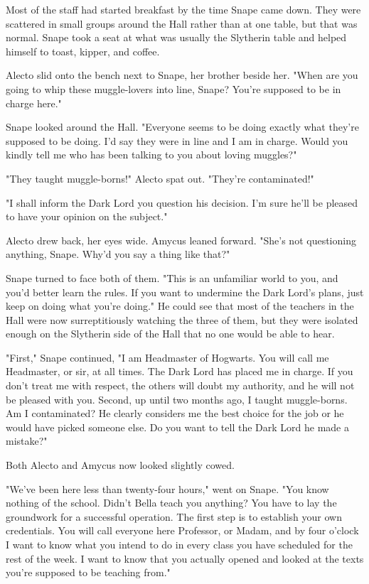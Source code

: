 \documentclass[a4paper,11pt]{article}
\begin{document}
Most of the staff had started breakfast by the time Snape came down. They were scattered in small groups around the Hall rather than at one table, but that was normal. Snape took a seat at what was usually the Slytherin table and helped himself to toast, kipper, and coffee.

Alecto slid onto the bench next to Snape, her brother beside her. "When are you going to whip these muggle-lovers into line, Snape? You're supposed to be in charge here."

Snape looked around the Hall. "Everyone seems to be doing exactly what they're supposed to be doing. I'd say they were in line and I am in charge. Would you kindly tell me who has been talking to you about loving muggles?"

"They taught muggle-borns!" Alecto spat out. "They're contaminated!"

"I shall inform the Dark Lord you question his decision. I'm sure he'll be pleased to have your opinion on the subject."

Alecto drew back, her eyes wide. Amycus leaned forward. "She's not questioning anything, Snape. Why'd you say a thing like that?"

Snape turned to face both of them. "This is an unfamiliar world to you, and you'd better learn the rules. If you want to undermine the Dark Lord's plans, just keep on doing what you're doing." He could see that most of the teachers in the Hall were now surreptitiously watching the three of them, but they were isolated enough on the Slytherin side of the Hall that no one would be able to hear.

"First," Snape continued, "I am Headmaster of Hogwarts. You will call me Headmaster, or sir, at all times. The Dark Lord has placed me in charge. If you don't treat me with respect, the others will doubt my authority, and he will not be pleased with you. Second, up until two months ago, I taught muggle-borns. Am I contaminated? He clearly considers me the best choice for the job or he would have picked someone else. Do you want to tell the Dark Lord he made a mistake?"

Both Alecto and Amycus now looked slightly cowed.

"We've been here less than twenty-four hours," went on Snape. "You know nothing of the school. Didn't Bella teach you anything? You have to lay the groundwork for a successful operation. The first step is to establish your own credentials. You will call everyone here Professor, or Madam, and by four o'clock I want to know what you intend to do in every class you have scheduled for the rest of the week. I want to know that you actually opened and looked at the texts you're supposed to be teaching from."
\end{document}

